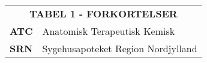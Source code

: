 \begin{table}[H]
\label{table:forkortelser}
\begin{tabular}{p{4.5cm} p{9.8cm}}
\multicolumn{2}{c}{\cellcolor[HTML]{C0C0C0}\textbf{TABEL 1 - FORKORTELSER}} \vspace{0.2cm} \\
\textbf{ATC} &  Anatomisk Terapeutisk Kemisk \vspace{0.2cm} \\
\textbf{SRN} & Sygehusapoteket Region Nordjylland \vspace{0.2cm} \\
\end{tabular}
\end{table}

